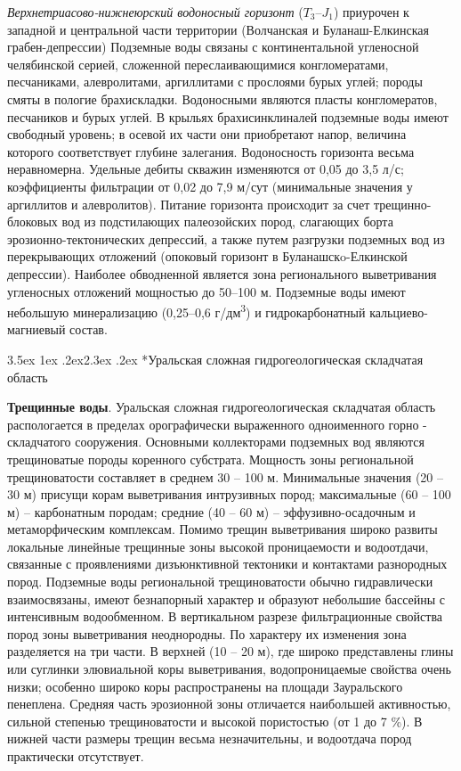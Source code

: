 \documentclass[a4paper,12pt]{article} %
\makeatletter
\renewcommand\section{\@startsection {section}{1}{\parindent}%
	{3.5ex \@plus 1ex \@minus .2ex}{2.3ex \@plus.2ex}%
	{\normalfont\hyphenpenalty=10000\Large\bfseries}}
\makeatother
\begin{document}
\textit{Верхнетриасово-нижнеюрский водоносный горизонт} ($T_3–J_1$) приурочен к западной и центральной части территории (Волчанская и Буланаш-Елкинская грабен-депрессии) Подземные воды связаны с континентальной угленосной челябинской серией, сложенной переслаивающимися конгломератами, песчаниками, алевролитами, аргиллитами с прослоями бурых углей; породы смяты в пологие брахискладки. Водоносными являются пласты конгломератов, песчаников и бурых углей. В крыльях брахисинклиналей подземные воды имеют свободный уровень; в осевой их части они приобретают напор, величина которого соответствует глубине залегания. Водоносность горизонта весьма неравномерна. Удельные дебиты скважин изменяются от 0,05 до 3,5 л/с; коэффициенты фильтрации от 0,02 до 7,9 м/сут (минимальные значения у аргиллитов и алевролитов). Питание горизонта происходит за счет трещинно-блоковых вод из подстилающих палеозойских пород, слагающих борта эрозионно-тектонических депрессий, а также путем разгрузки подземных вод из перекрывающих отложений (опоковый горизонт в Буланашскo-Елкинской депрессии). Наиболее обводненной является зона регионального выветривания угленосных отложений мощностью до 50–100 м. Подземные воды имеют небольшую минерализацию (0,25–0,6 г/дм\textsuperscript{3}) и гидрокарбонатный кальциево-магниевый состав.


\section*{Уральская сложная гидрогеологическая складчатая область}

\textbf{Трещинные воды}. Уральская сложная гидрогеологическая складчатая область распологается в пределах орографически выраженного одноименного горно - складчатого сооружения. Основными коллекторами подземных вод являются трещиноватые породы коренного субстрата. Мощность зоны региональной трещиноватости составляет в среднем 30 – 100 м. Минимальные значения (20 – 30 м) присущи корам выветривания интрузивных пород; максимальные (60 – 100 м) – карбонатным породам; средние (40 – 60 м) – эффузивно-осадочным и метаморфическим комплексам. Помимо трещин выветривания широко развиты локальные линейные трещинные зоны высокой проницаемости и водоотдачи, связанные с проявлениями дизъюнктивной тектоники и контактами разнородных пород. Подземные воды региональной трещиноватости обычно гидравлически взаимосвязаны, имеют безнапорный характер и образуют небольшие бассейны с интенсивным
водообменном. В вертикальном разрезе фильтрационные свойства пород зоны выветривания неоднородны. По характеру их изменения зона разделяется на три части. В верхней (10 – 20 м), где широко представлены глины или суглинки элювиальной коры выветривания, водопроницаемые свойства очень низки; особенно широко коры распространены на площади Зауральского пенеплена. Средняя часть эрозионной зоны отличается наибольшей активностью, сильной степенью трещиноватости и высокой пористостью (от 1 до 7 \%). В нижней части размеры трещин весьма незначительны, и водоотдача пород практически отсутствует.
\end{document}
